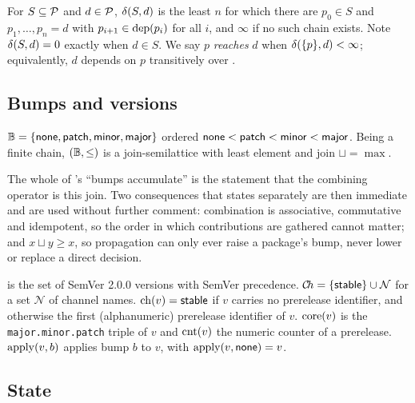 \begin{definition}
\label{def:dist}
For $S \subseteq \mathcal{P}$ and $d \in \mathcal{P}$, $\delta(S,d)$ is the least $n$ for
which there are $p_0 \in S$ and $p_1,\dots,p_n = d$ with $p_{i+1} \in
\mathrm{dep}(p_i)$ for all $i$, and $\infty$ if no such chain exists. Note
$\delta(S,d) = 0$ exactly when $d \in S$. We say $p$ \emph{reaches} $d$ when
$\delta(\{p\},d) < \infty$; equivalently, $d$ depends on $p$ transitively over
\Kprop{}.
\end{definition}

\subsection{Bumps and versions}

\begin{definition}
\label{def:bump}
$\mathbb{B} = \{\mathsf{none}, \mathsf{patch}, \mathsf{minor}, \mathsf{major}\}$ ordered
$\mathsf{none} < \mathsf{patch} < \mathsf{minor} < \mathsf{major}$. Being a finite chain, $(\mathbb{B}, \leq)$
is a join-semilattice with least element \bnone{} and join $\sqcup = \max$.
\end{definition}

The whole of 's ``bumps accumulate'' is the statement that the
combining operator is this join. Two consequences that \SPEC{} states
separately are then immediate and are used without further comment: combination
is associative, commutative and idempotent, so the order in which contributions
are gathered cannot matter; and $x \sqcup y \geq x$, so propagation can only
ever raise a package's bump, never lower or replace a direct decision.

\begin{definition}
\label{def:version}
\Vers{} is the set of SemVer 2.0.0 versions with SemVer precedence. $\mathcal{C}\!h =
\{\mathsf{stable}\} \cup \mathcal{N}$ for a set $\mathcal{N}$ of channel names.
$\mathrm{ch}(v) = \mathsf{stable}$ if $v$ carries no prerelease identifier, and otherwise
the first (alphanumeric) prerelease identifier of $v$. $\mathrm{core}(v)$ is the
\texttt{major.minor.patch} triple of $v$ and $\mathrm{cnt}(v)$ the numeric counter of
a prerelease. $\mathrm{apply}(v,b)$ applies bump $b$ to $v$, with $\mathrm{apply}(v,\mathsf{none})
= v$.
\end{definition}

\subsection{State}

